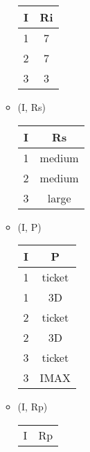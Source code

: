 \documentclass[12pt]{article}
\begin{document}
\begin{enumerate}
\begin{itemize}
                \begin{center}
                  \begin{tabular}{c c}
                    \hline
                    I & Ri \\
                    \hline
                    1 & 7  \\
                    2 & 7  \\
                    3 & 3  \\
                    \hline
                  \end{tabular}
                \end{center}
          \item (I, Rs)
                \begin{center}
                  \begin{tabular}{c c}
                    \hline
                    I & Rs \\
                    \hline
                    1 & medium  \\
                    2 & medium  \\
                    3 & large   \\
                    \hline
                  \end{tabular}
                \end{center}
          \item (I, P)
                \begin{center}
                  \begin{tabular}{c c}
                    \hline
                    I & P \\
                    \hline
                    1 & ticket \\
                    1 & 3D \\
                    2 & ticket \\
                    2 & 3D \\
                    3 & ticket \\
                    3 & IMAX  \\
                    \hline
                  \end{tabular}
                \end{center}
          \item (I, Rp)
                \begin{center}
                  \begin{tabular}{c c}
                    \hline
                    I & Rp \\

\end{tabular}
\end{center}
\end{itemize}
\end{enumerate}
\end{document}
